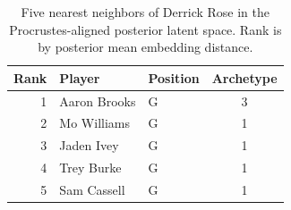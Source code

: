 \begin{table}[htbp]
  \centering\small
  \begin{tabular}{rllc}
    \toprule
    Rank & Player & Position & Archetype \\
    \midrule
    1 & Aaron Brooks & G & 3 \\
    2 & Mo Williams & G & 1 \\
    3 & Jaden Ivey & G & 1 \\
    4 & Trey Burke & G & 1 \\
    5 & Sam Cassell & G & 1 \\
    \bottomrule
  \end{tabular}
  \caption{Five nearest neighbors of Derrick Rose in the Procrustes-aligned posterior latent space. Rank is by posterior mean embedding distance.}
  \label{tab:Derrick_Rose_neighbors}
\end{table}

